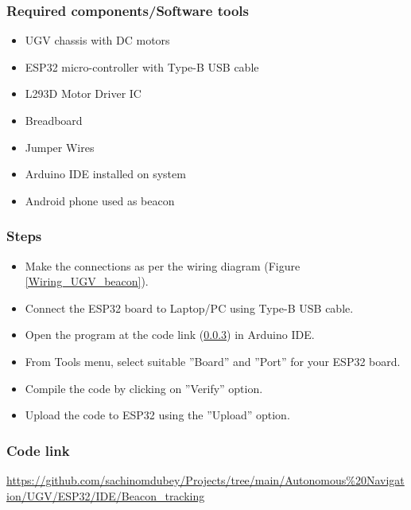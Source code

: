 \subsubsection{Required components/Software tools}
\begin{itemize}
    \item  UGV chassis with DC motors
    \item  ESP32 micro-controller with Type-B USB cable
    \item  L293D Motor Driver IC
    \item  Breadboard
    \item  Jumper Wires
    \item  Arduino IDE installed on system
    \item  Android phone used as beacon
\end{itemize}



\subsubsection{Steps}
\begin{itemize}
    \item Make the connections as per the wiring diagram (Figure \ref{Wiring_UGV_beacon}).
    \item Connect the ESP32 board to Laptop/PC using Type-B USB cable.
    \item Open the program at the code link (\ref{code_link_ESP32_beacon}) in Arduino IDE.
    \item From Tools menu, select suitable ”Board” and ”Port” for your ESP32 board.
    \item Compile the code by clicking on ”Verify” option.
    \item Upload the code to ESP32 using the ”Upload” option.
\end{itemize}

\subsubsection{{Code link}} \label{code_link_ESP32_beacon}
\begin{tcolorbox}
\url{https://github.com/sachinomdubey/Projects/tree/main/Autonomous\%20Navigation/UGV/ESP32/IDE/Beacon_tracking}
\end{tcolorbox}

